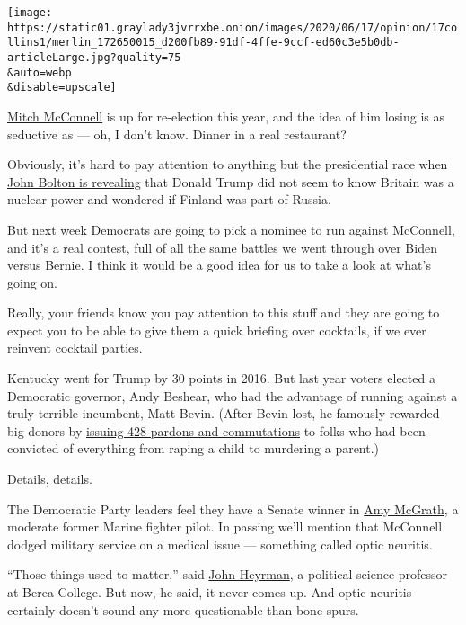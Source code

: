\texttt{[image: https://static01.graylady3jvrrxbe.onion/images/2020/06/17/opinion/17collins1/merlin\_172650015\_d200fb89-91df-4ffe-9ccf-ed60c3e5b0db-articleLarge.jpg?quality=75\\\&auto=webp\\\&disable=upscale]}

\href{https://www.nytimes3xbfgragh.onion/2020/06/23/us/politics/mitch-mcconnell-kentucky-primary.html}{Mitch
McConnell} is up for re-election this year, and the idea of him losing
is as seductive as --- oh, I don't know. Dinner in a real restaurant?

Obviously, it's hard to pay attention to anything but the presidential
race when
\href{https://www.nytimes3xbfgragh.onion/2020/06/17/us/politics/bolton-book-trump-impeached.html}{John
Bolton is revealing} that Donald Trump did not seem to know Britain was
a nuclear power and wondered if Finland was part of Russia.

But next week Democrats are going to pick a nominee to run against
McConnell, and it's a real contest, full of all the same battles we went
through over Biden versus Bernie. I think it would be a good idea for us
to take a look at what's going on.

Really, your friends know you pay attention to this stuff and they are
going to expect you to be able to give them a quick briefing over
cocktails, if we ever reinvent cocktail parties.

Kentucky went for Trump by 30 points in 2016. But last year voters
elected a Democratic governor, Andy Beshear, who had the advantage of
running against a truly terrible incumbent, Matt Bevin. (After Bevin
lost, he famously rewarded big donors by
\href{https://www.courier-journal.com/story/news/politics/2019/12/11/bevin-issued-hundreds-pardons-and-commutations-final-day/4399770002/}{issuing
428 pardons and commutations} to folks who had been convicted of
everything from raping a child to murdering a parent.)

Details, details.

The Democratic Party leaders feel they have a Senate winner in
\href{https://www.nytimes3xbfgragh.onion/2020/06/22/us/politics/charles-booker-amy-mcgrath-kentucky-adverstising.html}{Amy
McGrath}, a moderate former Marine fighter pilot. In passing we'll
mention that McConnell dodged military service on a medical issue ---
something called optic neuritis.

``Those things used to matter,'' said
\href{https://www.berea.edu/psc/faculty-and-staff/dr-john-heyrman/}{John
Heyrman}, a political-science professor at Berea College. But now, he
said, it never comes up. And optic neuritis certainly doesn't sound any
more questionable than bone spurs.

